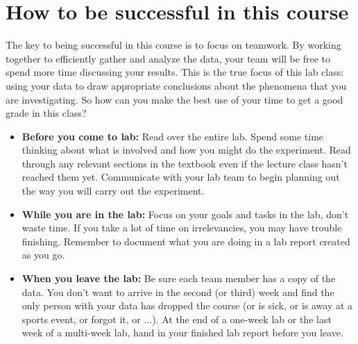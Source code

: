 \section*{How to be successful in this course}
The key to being successful in this course is to focus on teamwork.
By working together to efficiently gather and analyze the data, your team will be free to spend more time discussing your results.
This is the true focus of this lab class: using your data to draw appropriate conclusions about the phenomena that you are investigating.
So how can you make the best use of your time to get a good grade in this class?
\begin{itemize}
	\setlength\itemsep{2pt}
	\item \textbf{Before you come to lab:} Read over the entire lab.
	Spend some time thinking about what is involved and how you might do the experiment.
	Read through any relevant sections in the textbook even if the lecture class hasn't reached them yet.
	Communicate with your lab team to begin planning out the way you will carry out the experiment.
	\item \textbf{While you are in the lab:} Focus on your goals and tasks in the lab, don't waste time.
	If you take a lot of time on irrelevancies, you may have trouble finishing.
	Remember to document what you are doing in a lab report created as you go.
	\item \textbf{When you leave the lab:} Be sure each team member has a copy of the data.
	You don't want to arrive in the second (or third) week and find the only person with your data has dropped the course (or is sick, or is away at a sports event, or forgot it, or ...).
	At the end of a one-week lab or the last week of a multi-week lab, hand in your finished lab report before you leave.
\end{itemize}

